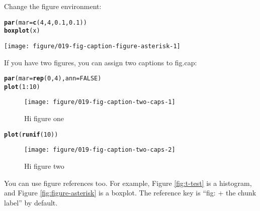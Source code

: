 \documentclass{article}\usepackage[]{graphicx}\usepackage[]{xcolor}
\makeatletter
\def\maxwidth{ %
  \ifdim\Gin@nat@width>\linewidth
    \linewidth
  \else
    \Gin@nat@width
  \fi
}
\newcommand{\hlnum}[1]{\textcolor[rgb]{0.686,0.059,0.569}{#1}}%
\newcommand{\hlopt}[1]{\textcolor[rgb]{0,0,0}{#1}}%
\newcommand{\hldef}[1]{\textcolor[rgb]{0.345,0.345,0.345}{#1}}%
\newcommand{\hlkwc}[1]{\textcolor[rgb]{0.333,0.667,0.333}{#1}}%
\newcommand{\hlkwd}[1]{\textcolor[rgb]{0.737,0.353,0.396}{\textbf{#1}}}%
\newenvironment{kframe}{%
 \def\at@end@of@kframe{}%
 \ifinner\ifhmode%
  \def\at@end@of@kframe{\end{minipage}}%
  \begin{minipage}{\columnwidth}%
 \fi\fi%
 \def\FrameCommand##1{\hskip\@totalleftmargin \hskip-\fboxsep
 \colorbox{shadecolor}{##1}\hskip-\fboxsep
     \hskip-\linewidth \hskip-\@totalleftmargin \hskip\columnwidth}%
 \MakeFramed {\advance\hsize-\width
   \@totalleftmargin\z@ \linewidth\hsize
   \@setminipage}}%
 {\par\unskip\endMakeFramed%
 \at@end@of@kframe}
\newenvironment{knitrout}{}{} %
\makeatother
\begin{document}
Change the figure environment:

\begin{knitrout}
\color{fgcolor}\begin{kframe}
\begin{alltt}
\hlkwd{par}\hldef{(}\hlkwc{mar} \hldef{=} \hlkwd{c}\hldef{(}\hlnum{4}\hldef{,} \hlnum{4}\hldef{,} \hlnum{0.1}\hldef{,} \hlnum{0.1}\hldef{))}
\hlkwd{boxplot}\hldef{(x)}
\end{alltt}
\end{kframe}\begin{figure*}
\texttt{[image: figure/019-fig-caption-figure-asterisk-1]} \caption[Figure * environment]{Figure * environment.}\label{fig:figure-asterisk}
\end{figure*}

\end{knitrout}

If you have two figures, you can assign two captions to fig.cap:

\begin{knitrout}
\color{fgcolor}\begin{kframe}
\begin{alltt}
\hlkwd{par}\hldef{(}\hlkwc{mar} \hldef{=} \hlkwd{rep}\hldef{(}\hlnum{0}\hldef{,} \hlnum{4}\hldef{),} \hlkwc{ann} \hldef{=} \hlnum{FALSE}\hldef{)}
\hlkwd{plot}\hldef{(}\hlnum{1}\hlopt{:}\hlnum{10}\hldef{)}
\end{alltt}
\end{kframe}\begin{figure}

{\centering \texttt{[image: figure/019-fig-caption-two-caps-1]} 

}

\caption[Hi figure one]{Hi figure one}\label{fig:two-caps-1}
\end{figure}

\begin{kframe}\begin{alltt}
\hlkwd{plot}\hldef{(}\hlkwd{runif}\hldef{(}\hlnum{10}\hldef{))}
\end{alltt}
\end{kframe}\begin{figure}

{\centering \texttt{[image: figure/019-fig-caption-two-caps-2]} 

}

\caption[Hi figure two]{Hi figure two}\label{fig:two-caps-2}
\end{figure}

\end{knitrout}

You can use figure references too. For example, Figure \ref{fig:t-test} is a histogram, and Figure \ref{fig:figure-asterisk} is a boxplot. The reference key is ``fig: + the chunk label'' by default.
\end{document}
